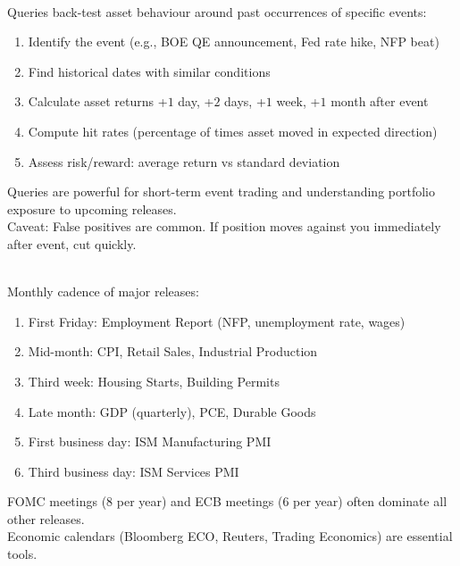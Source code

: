\begin{remark} \\
Queries back-test asset behaviour around past occurrences of specific events:
\begin{enumerate}[label=\roman*.]
\setlength{\itemsep}{0pt}
\item Identify the event (e.g., BOE QE announcement, Fed rate hike, NFP beat)
\item Find historical dates with similar conditions
\item Calculate asset returns +$1$ day, +$2$ days, +$1$ week, +$1$ month after event
\item Compute hit rates (percentage of times asset moved in expected direction)
\item Assess risk/reward: average return vs standard deviation
\end{enumerate}
Queries are powerful for short-term event trading and understanding portfolio exposure to upcoming releases.\\
Caveat: False positives are common. If position moves against you immediately after event, cut quickly.
\end{remark}

\begin{remark} \\
Monthly cadence of major releases:
\begin{enumerate}[label=\roman*.]
\setlength{\itemsep}{0pt}
\item First Friday: Employment Report (NFP, unemployment rate, wages)
\item Mid-month: CPI, Retail Sales, Industrial Production
\item Third week: Housing Starts, Building Permits
\item Late month: GDP (quarterly), PCE, Durable Goods
\item First business day: ISM Manufacturing PMI
\item Third business day: ISM Services PMI
\end{enumerate}
FOMC meetings (8 per year) and ECB meetings (6 per year) often dominate all other releases.\\
Economic calendars (Bloomberg ECO, Reuters, Trading Economics) are essential tools.
\end{remark}


